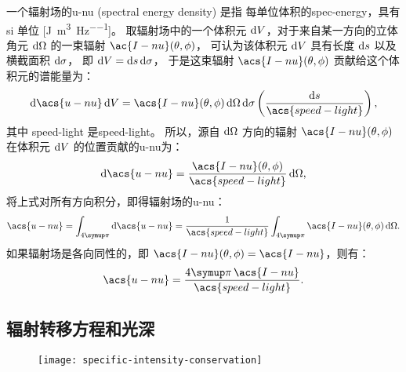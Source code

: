 一个辐射场的\acl{u-nu} (spectral energy density) 是指
每单位体积的\ac{spec-energy}，具有 \ac{si} 单位
[\si{\joule\per\cubic\meter\per\hertz}]。
取辐射场中的一个体积元 $\mathrm{d}V$，对于来自某一方向的立体角元 $\mathrm{d}\Omega$
的一束辐射 $\ac{I-nu}(\theta,\phi)$，
可认为该体积元 $\mathrm{d}V$ 具有长度 $\mathrm{d}s$ 以及横截面积 $\mathrm{d}\sigma$，
即 $\mathrm{d}V = \mathrm{d}s\,\mathrm{d}\sigma$，
于是这束辐射 $\acs{I-nu}(\theta,\phi)$ 贡献给这个体积元的谱能量为：
\begin{equation}
  \D{\acs{u-nu}}\,\D{V}
    = \acs{I-nu}(\theta,\phi) \,\D{\Omega}\,\D{\sigma}
      \left( \frac{\D{s}}{\acs{speed-light}} \right) ,
\end{equation}
其中 \acs{speed-light} 是\acl{speed-light}。
所以，源自 $\mathrm{d}\Omega$ 方向的辐射 $\acs{I-nu}(\theta,\phi)$
在体积元 $\mathrm{d}V$ 的位置贡献的\acl{u-nu}为：
\begin{equation}
  \D{\acs{u-nu}}
    = \frac{\acs{I-nu}(\theta,\phi)}{\acs{speed-light}} \,\D{\Omega} ,
\end{equation}
将上式对所有方向积分，即得辐射场的\acl{u-nu}：
\begin{equation}
  \label{eq:spectral-energy-density}
  \acs{u-nu}
    = \int_{4\Cpi} \D{\acs{u-nu}}
    = \frac{1}{\acs{speed-light}}
      \int_{4\Cpi} \acs{I-nu}(\theta,\phi) \,\D{\Omega} .
\end{equation}
如果辐射场是各向同性的，即 $\acs{I-nu}(\theta,\phi) = \acs{I-nu}$，则有：
\begin{equation}
  \label{eq:spectral-energy-density-iso}
  \acs{u-nu} = \frac{4\Cpi \, \acs{I-nu}}{\acs{speed-light}} .
\end{equation}

\subsection{辐射转移方程和光深}
\label{sec:radiative-transfer}

\begin{figure}[htp]
  \centering
  \texttt{[image: specific-intensity-conservation]}
  \label{fig:intensity-conservation}
\end{figure}

